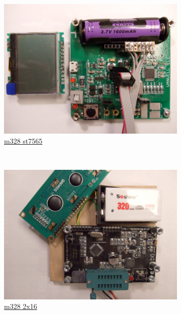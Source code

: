 \documentclass[pdftex,12pt,a4paper,english]{article}
\begin{document}
\begin{figure}[H]
  \begin{subfigure}[b]{.3\textwidth}
    \centering
    \includegraphics[width=1.\textwidth]{../PNG/m328_van_st7565.JPG}
	  \\ \vspace{-0.5em}
	  {\href{run:./trunk/mega328_wei_st7565/}{m328 st7565}}
  \end{subfigure}
~
  \begin{subfigure}[b]{.3\textwidth}
    \centering
    \includegraphics[width=1.\textwidth]{../PNG/m328_2x16.JPG}
	  \\ \vspace{-0.5em}
	  {\href{run:./trunk/mega328_2X16_menu/}{m328 2x16}} \hspace{10pt}

\end{subfigure}
\end{figure}
\end{document}
